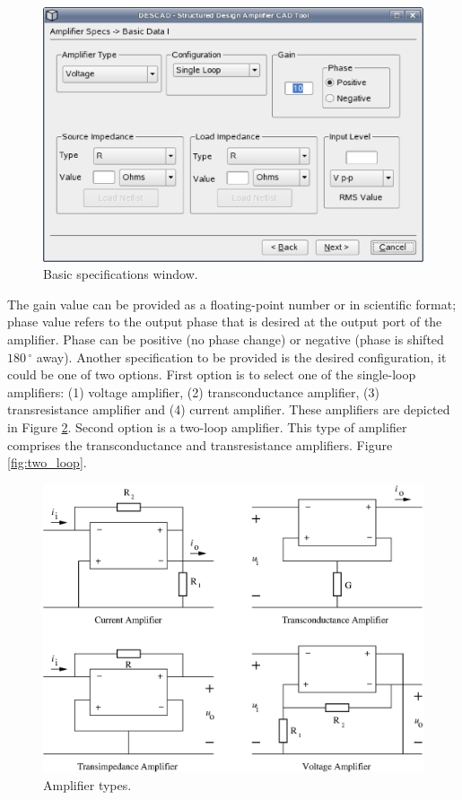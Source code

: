 \documentclass[twocolumn]{IEEEtran}
\begin{document}
\begin{figure}[hbtp]
	\centering
	\includegraphics[scale=0.3]{figuras/step1.eps}
	\caption{Basic specifications window.}
	\label{fig:des1}
\end{figure}

The gain value can be provided as a floating-point number or in scientific format; phase value refers to the output phase that is desired at the output port of the amplifier. Phase can be positive (no phase change) or negative (phase is shifted $180\,^{\circ}$ away). Another specification to be provided is the desired configuration, it could be one of two options. First option is to select one of the single-loop amplifiers: (1) voltage amplifier, (2) transconductance amplifier, (3) transresistance amplifier and (4) current amplifier. These amplifiers are depicted in Figure \ref{fig:amps}. Second option is a two-loop amplifier. This type of amplifier comprises the transconductance and transresistance amplifiers. Figure \ref{fig:two_loop}.

\begin{figure}[hbtp]
	\centering
	\includegraphics[scale=0.5]{figuras/grupo_eng.eps}
	\caption{Amplifier types.}
	\label{fig:amps}
\end{figure}
\end{document}
